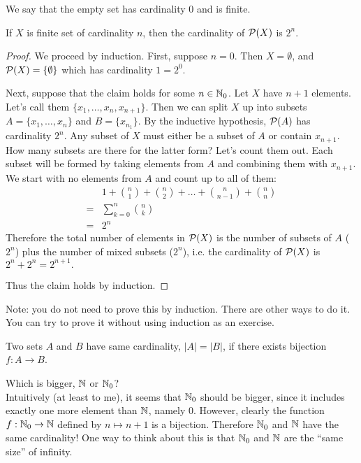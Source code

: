 \documentclass{article}
\begin{document}
We say that the empty set has cardinality 0 and is finite.

\begin{proposition}
 If $X$ is finite set of cardinality $n$, then the cardinality of $\mathcal{P}(X)$ is $2^n$.
\end{proposition}
\begin{proof}
We proceed by induction. First, suppose $n=0$. Then $X = \emptyset$, and $\mathcal{P}(X) = \{ \emptyset \}$ which has cardinality $1 = 2^0$.

Next, suppose that the claim holds for some $n \in {\mathbb{N}}_0$. Let $X$ have $n+1$ elements. Let's call them $\{x_1, \ldots, x_n, x_{n+1}\}$. Then we can split $X$ up into subsets $A=\{x_1, \ldots, x_n\}$ and $B=\{ x_{n_1}\}$. By the inductive hypothesis, $\mathcal{P}(A)$ has cardinality $2^n$. Any subset of $X$ must either be a subset of $A$ or contain $x_{n+1}$. How many subsets are there for the latter form? Let's count them out. Each subset will be formed by taking elements from $A$ and combining them with $x_{n+1}$. We start with no elements from $A$ and count up to all of them:
\begin{align*}
& 1 + \binom{n}{1} + \binom{n}{2} + \ldots + \binom{n}{n-1}  + \binom{n}{n} \\
=& \sum_{k=0}^n \binom{n}{k} \\
=& 2^n
\end{align*}
Therefore the total number of elements in $\mathcal{P}(X)$ is the number of subsets of $A$ ($2^n$) plus the number of mixed subsets ($2^n$), i.e. the cardinality of $\mathcal{P}(X)$ is $2^n+ 2^n = 2^{n+1}.$

Thus the claim holds by induction. 
\end{proof}

Note: you do not need to prove this by induction. There are other ways to do it. You can try to prove it without using induction as an exercise.

\begin{definition}
Two sets $A$ and $B$ have same cardinality, $|A| = |B|$, if there exists bijection $f:A \to B$.
\end{definition}

\begin{example}
Which is bigger, ${\mathbb{N}}$ or ${\mathbb{N}}_0$? \\
Intuitively (at least to me), it seems that ${\mathbb{N}}_0$ should be bigger, since it includes exactly one more element than ${\mathbb{N}}$, namely 0. However, clearly the function $f:{\mathbb{N}}_0 \to {\mathbb{N}}$ defined by $n \mapsto n+1$ is a bijection. Therefore ${\mathbb{N}}_0$ and ${\mathbb{N}}$ have the same cardinality! One way to think about this is that ${\mathbb{N}}_0$ and ${\mathbb{N}}$ are the ``same size'' of infinity. 
\end{example}
\end{document}
